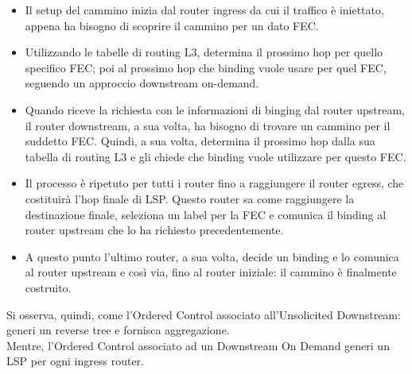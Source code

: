 \documentclass{article}
\begin{document}
\begin{itemize}
    \item Il setup del cammino inizia dal router ingress da cui il traffico è iniettato, appena ha bisogno di scoprire il cammino per un dato FEC.
    \item Utilizzando le tabelle di routing L3, determina il prossimo hop per quello specifico FEC; poi al prossimo hop che binding vuole usare per quel FEC, seguendo un approccio downstream on-demand.
    \item Quando riceve la richiesta con le informazioni di binging dal router upstream, il router downstream, a sua volta, ha bisogno di trovare un cammino per il suddetto FEC. Quindi, a sua volta, determina il prossimo hop dalla sua tabella di routing L3 e gli chiede che binding vuole utilizzare per questo FEC.
    \item Il processo è ripetuto per tutti i router fino a raggiungere il router egress, che costituirà l'hop finale di LSP. Questo router sa come raggiungere la destinazione finale, seleziona un label per la FEC e comunica il binding al router upstream che lo ha richiesto precedentemente.
    \item A questo punto l'ultimo router, a sua volta, decide un binding e lo comunica al router upstream e così via, fino al router iniziale: il cammino è finalmente costruito.
\end{itemize}
Si osserva, quindi, come l'Ordered Control associato all'Unsolicited Downstream: generi un reverse tree e fornisca aggregazione. \\ Mentre, l'Ordered Control associato ad un Downstream On Demand generi un LSP per ogni ingress router.
\end{document}
